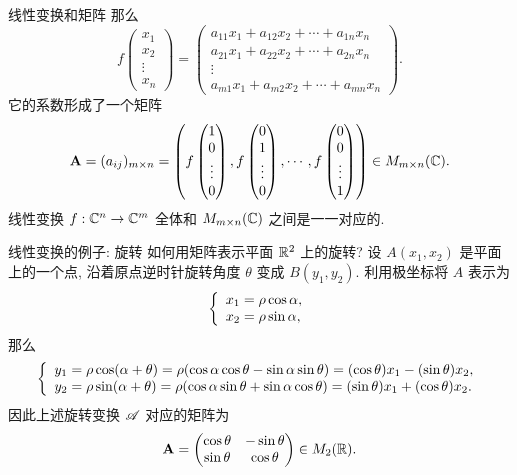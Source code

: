 \begin{frame}{线性变换和矩阵}
	\onslide<+->
	那么
	\[f\begin{pmatrix}
		x_1\\x_2\\\vdots\\x_n
	\end{pmatrix}=\begin{pmatrix}
		a_{11}x_1+a_{12}x_2+\cdots+a_{1n}x_n\\
		a_{21}x_1+a_{22}x_2+\cdots+a_{2n}x_n\\
		\vdots\\
		a_{m1}x_1+a_{m2}x_2+\cdots+a_{mn}x_n
	\end{pmatrix}.\]
	\onslide<+->
	它的系数形成了一个矩阵
	\[{\mathbf{A}}=(a_{ij})_{m\times n}=\left(f\begin{pmatrix}
		1\\0\\\vdots\\0
	\end{pmatrix},
	f\begin{pmatrix}
		0\\1\\\vdots\\0
	\end{pmatrix},\cdots,
	f\begin{pmatrix}
		0\\0\\\vdots\\1
	\end{pmatrix}\right)\in M_{m\times n}({\mathbb{C}}).\]
	\onslide<+->
	线性变换 $f:{\mathbb{C}}^n\to{\mathbb{C}}^m$ 全体和 $M_{m\times n}({\mathbb{C}})$ 之间是一一对应的.
\end{frame}


\begin{frame}{线性变换的例子: 旋转}
	\onslide<+->
	如何用矩阵表示平面 ${\mathbb{R}}^2$ 上的旋转?
	\onslide<+->
	设 $A(x_1,x_2)$ 是平面上的一个点, 沿着原点逆时针旋转角度 $\theta$ 变成 $B(y_1,y_2)$.
	\onslide<+->
	利用极坐标将 $A$ 表示为
	\[\left\{\begin{array}{l}x_1=\rho\cos\alpha,\\x_2=\rho\sin\alpha,\end{array}\right.\]
	那么
	\[\left\{\begin{array}{l}y_1=\rho\cos(\alpha+\theta)=\rho(\cos\alpha\cos\theta-\sin\alpha\sin\theta)=(\cos\theta)x_1-(\sin\theta)x_2,\\
	y_2=\rho\sin(\alpha+\theta)=\rho(\cos\alpha\sin\theta+\sin\alpha\cos\theta)=(\sin\theta)x_1+(\cos\theta)x_2.\end{array}\right.\]
	\onslide<+->
	因此上述旋转变换 $\mathscr{A}$ 对应的矩阵为
	\[{\mathbf{A}}=\begin{pmatrix}
		\cos\theta&-\sin\theta\\
		\sin\theta&\cos\theta
	\end{pmatrix}\in M_2({\mathbb{R}}).\]
\end{frame}


